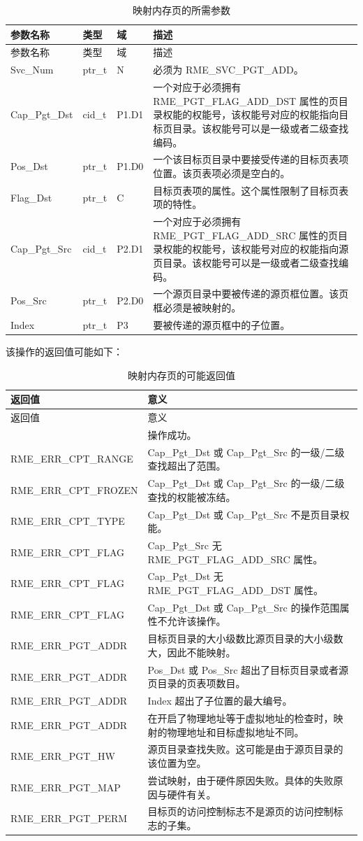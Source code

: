 \begin{xltabular}{\textwidth}{@{}>{\hsize\raggedright\arraybackslash}X>{\hsize\raggedright\arraybackslash}X>{\hsize\raggedright\arraybackslash}X>{\hsize\raggedright\arraybackslash}X@{}}
\caption{映射内存页的所需参数}\label{tab:3-14-map-memory-page-parameters}\\
\toprule
参数名称 & 类型 & 域 & 描述\tabularnewline
\endfirsthead
\toprule
参数名称 & 类型 & 域 & 描述\tabularnewline
\midrule
\endhead
\bottomrule
\endlastfoot
Svc\_Num & ptr\_t & N & 必须为 RME\_SVC\_PGT\_ADD。\tabularnewline
Cap\_Pgt\_Dst & cid\_t & P1.D1 &
一个对应于必须拥有 RME\_PGT\_FLAG\_ADD\_DST 属性的页目录权能的权能号，该权能号对应的权能指向目标页目录。该权能号可以是一级或者二级查找编码。\tabularnewline
Pos\_Dst & ptr\_t & P1.D0 &
一个该目标页目录中要接受传递的目标页表项位置。该页表项必须是空白的。\tabularnewline
Flag\_Dst & ptr\_t & C &
目标页表项的属性。这个属性限制了目标页表项的特性。\tabularnewline
Cap\_Pgt\_Src & cid\_t & P2.D1 &
一个对应于必须拥有 RME\_PGT\_FLAG\_ADD\_SRC 属性的页目录权能的权能号，该权能号对应的权能指向源页目录。该权能号可以是一级或者二级查找编码。\tabularnewline
Pos\_Src & ptr\_t & P2.D0 &
一个源页目录中要被传递的源页框位置。该页框必须是被映射的。\tabularnewline
Index & ptr\_t & P3 & 要被传递的源页框中的子位置。\tabularnewline
\end{xltabular}

该操作的返回值可能如下：

\begin{xltabular}{\textwidth}{@{}>{\hsize\raggedright\arraybackslash}X>{\hsize\raggedright\arraybackslash}X@{}}
\caption{映射内存页的可能返回值}\label{tab:3-15-map-memory-page-return-values}\\
\toprule
返回值 & 意义\tabularnewline
\endfirsthead
\toprule
返回值 & 意义\tabularnewline
\midrule
\endhead
\bottomrule
{} & 操作成功。\tabularnewline
    RME\_ERR\_CPT\_RANGE & Cap\_Pgt\_Dst 或 Cap\_Pgt\_Src 的一级/二级查找超出了范围。\tabularnewline
    RME\_ERR\_CPT\_FROZEN & Cap\_Pgt\_Dst 或 Cap\_Pgt\_Src 的一级/二级查找的权能被冻结。\tabularnewline
    RME\_ERR\_CPT\_TYPE & Cap\_Pgt\_Dst 或 Cap\_Pgt\_Src 不是页目录权能。\tabularnewline
    RME\_ERR\_CPT\_FLAG & Cap\_Pgt\_Src 无 RME\_PGT\_FLAG\_ADD\_SRC 属性。\tabularnewline
    RME\_ERR\_CPT\_FLAG & Cap\_Pgt\_Dst 无 RME\_PGT\_FLAG\_ADD\_DST 属性。\tabularnewline
    RME\_ERR\_CPT\_FLAG & Cap\_Pgt\_Dst 或 Cap\_Pgt\_Src 的操作范围属性不允许该操作。\tabularnewline
    RME\_ERR\_PGT\_ADDR & 目标页目录的大小级数比源页目录的大小级数大，因此不能映射。\tabularnewline
    RME\_ERR\_PGT\_ADDR & Pos\_Dst 或 Pos\_Src 超出了目标页目录或者源页目录的页表项数目。\tabularnewline
    RME\_ERR\_PGT\_ADDR & Index 超出了子位置的最大编号。\tabularnewline
    RME\_ERR\_PGT\_ADDR & 在开启了物理地址等于虚拟地址的检查时，映射的物理地址和目标虚拟地址不同。\tabularnewline
    RME\_ERR\_PGT\_HW & 源页目录查找失败。这可能是由于源页目录的该位置为空。\tabularnewline
    RME\_ERR\_PGT\_MAP & 尝试映射，由于硬件原因失败。具体的失败原因与硬件有关。\tabularnewline
    RME\_ERR\_PGT\_PERM & 目标页的访问控制标志不是源页的访问控制标志的子集。\tabularnewline
\end{xltabular}


